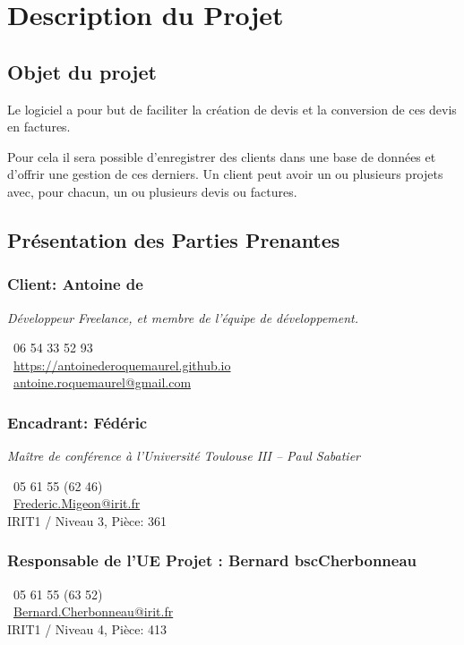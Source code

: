 \chapter{Description du Projet}
\section{Objet du projet}
Le logiciel a pour but de faciliter la création de devis et la conversion de ces devis en factures. 

Pour cela il sera possible d’enregistrer des
clients dans une base de données et d’offrir une gestion de ces derniers. Un client peut avoir un ou plusieurs projets avec, pour chacun, un ou
plusieurs devis ou factures.

\section{Présentation des Parties Prenantes}
	\subsection{Client: Antoine de }
	\textit{Développeur Freelance, et membre de l'équipe de développement. }

		\Telefon~06 54 33 52 93\\
		\Mundus~\url{https://antoinederoquemaurel.github.io}\\
		\Letter~\href{mailto:antoine.roquemaurel@gmail.com}{antoine.roquemaurel@gmail.com} \\		
	\subsection{Encadrant: Fédéric }
	\textit{Maître de conférence à l'Université Toulouse III -- Paul Sabatier}

		\Telefon~05 61 55 (62 46) \\
		\Letter~\href{mailto:Frederic.Migeon@irit.fr}{Frederic.Migeon@irit.fr} \\
		IRIT1 / Niveau 3, Pièce: 361 \\

		\subsection{Responsable de l'UE Projet : Bernard bsc{Cherbonneau}}
		\Telefon~05 61 55 (63 52)\\
		\Letter~\href{mailto:Bernard.Cherbonneau@irit.fr}{Bernard.Cherbonneau@irit.fr}\\
		IRIT1 / Niveau 4, Pièce: 413

